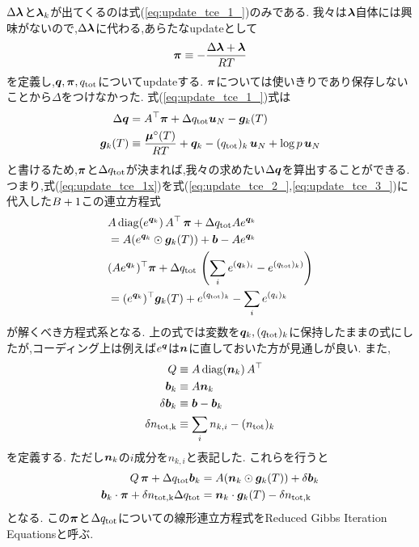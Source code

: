 $\Delta \boldsymbol{\lambda}$と$\boldsymbol{\lambda}_k$が出てくるのは式(\ref{eq:update_tce_1_})のみである. 我々は$\boldsymbol{\lambda}$自体には興味がないので,$\Delta \boldsymbol{\lambda}$に代わる,あらたなupdateとして
\begin{align}
    \boldsymbol{\pi} \equiv - \frac{\Delta \boldsymbol{\lambda} + \boldsymbol{\lambda}}{RT} 
\end{align}
を定義し,$\boldsymbol{q}, \boldsymbol{\pi}, q_\mathrm{tot}$についてupdateする. $\boldsymbol{\pi}$については使いきりであり保存しないことから$\Delta$をつけなかった. 式(\ref{eq:update_tce_1_})式は
\begin{align}
\label{eq:update_tce_1x}
    \Delta \boldsymbol{q} &=  A^\top \boldsymbol{\pi} + \Delta q_\mathrm{tot} \boldsymbol{u}_N - \boldsymbol{g}_k(T) \\
    \boldsymbol{g}_k (T) &\equiv \frac{\boldsymbol{\mu}^\circ(T)}{RT} + {\boldsymbol{q}}_k - (q_\mathrm{tot})_k \, \boldsymbol{u}_N + \log{p} \, \boldsymbol{u}_N 
\end{align}
と書けるため,$\boldsymbol{\pi}$と$\Delta q_\mathrm{tot}$が決まれば,我々の求めたい$\Delta \boldsymbol{q}$を算出することができる. つまり,式(\ref{eq:update_tce_1x})を式(\ref{eq:update_tce_2_},\ref{eq:update_tce_3_})に代入した$B+1$この連立方程式
\begin{align}
    &A \, \mathrm{diag} (e^{\boldsymbol{q}_k}) \, A^\top \, \boldsymbol{\pi} + \Delta q_\mathrm{tot} A e^{\boldsymbol{q}_k} \nonumber \\
    &= A (e^{\boldsymbol{q}_k} \odot \boldsymbol{g}_k (T) ) + \boldsymbol{b} - A  e^{\boldsymbol{q}_k} \\
    &(A  e^{\boldsymbol{q}_k})^\top \boldsymbol{\pi} + \Delta q_\mathrm{tot} \, \left( \sum_i e^{(\boldsymbol{q}_k)_i} - e^{(q_\mathrm{tot})_k)} \right) \nonumber \\ 
    &= (e^{\boldsymbol{q}_k})^\top \boldsymbol{g}_k(T) + e^{(q_\mathrm{tot})_k} - \sum_i {e^{(q_i)_k}} 
\end{align}
が解くべき方程式系となる. 上の式では変数を$\boldsymbol{q}_k, (q_\mathrm{tot})_k$に保持したままの式にしたが,コーディング上は例えば$e^{\boldsymbol{q}}$は$\boldsymbol{n}$に直しておいた方が見通しが良い. また,
\begin{align}
    Q &\equiv  A \, \mathrm{diag} (\boldsymbol{n}_k) \, A^\top \\
    \boldsymbol{b}_k &\equiv A \boldsymbol{n}_k \\
    \delta \boldsymbol{b}_k &\equiv \boldsymbol{b} - \boldsymbol{b}_k \\
     \delta n_\mathrm{tot,k} &\equiv  \sum_i n_{k,i} - (n_\mathrm{tot})_{k}
\end{align}
を定義する. ただし$\boldsymbol{n}_k$の$i$成分を$n_{k,i}$と表記した. これらを行うと
\begin{align}
\label{eq:rgie1}
   Q \, \boldsymbol{\pi} + \Delta q_\mathrm{tot} \boldsymbol{b}_k &= A ( \boldsymbol{n}_k \odot \boldsymbol{g}_k (T) ) + \delta \boldsymbol{b}_k \\
\label{eq:rgie2}
\boldsymbol{b}_k \cdot \boldsymbol{\pi} + \delta n_\mathrm{tot, k} \Delta q_\mathrm{tot} &= \boldsymbol{n}_k \cdot \boldsymbol{g}_k(T) - \delta n_\mathrm{tot,k}
\end{align}
となる. この$\boldsymbol{\pi}$と$\Delta q_\mathrm{tot}$についての線形連立方程式をReduced Gibbs Iteration Equationsと呼ぶ. 
